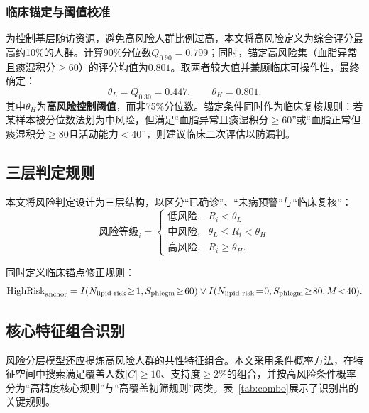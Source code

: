 \documentclass[a4paper,12pt]{ctexart}
\begin{document}
\subsubsection{临床锚定与阈值校准}
为控制基层随访资源，避免高风险人群比例过高，本文将高风险定义为综合评分最高约10\%的人群。计算90\%分位数$Q_{0.90}=0.799$；同时，锚定高风险集（血脂异常且痰湿积分$\geq60$）的评分均值为$0.801$。取两者较大值并兼顾临床可操作性，最终确定：
\begin{equation}
\theta_L=Q_{0.30}=0.447, \qquad \theta_H=0.801.
\end{equation}
其中$\theta_H$为\textbf{高风险控制阈值}，而非75\%分位数。锚定条件同时作为临床复核规则：若某样本被分位数法划为中风险，但满足``血脂异常且痰湿积分$\geq60$''或``血脂正常但痰湿积分$\geq80$且活动能力$<40$''，则建议临床二次评估以防漏判。

\subsection{三层判定规则}

本文将风险判定设计为三层结构，以区分``已确诊''、``未病预警''与``临床复核''：
\begin{equation}
\text{风险等级}_i =
\begin{cases}
\text{低风险}, & R_i < \theta_L \\
\text{中风险}, & \theta_L \leq R_i < \theta_H \\
\text{高风险}, & R_i \geq \theta_H.
\end{cases}
\end{equation}

同时定义临床锚点修正规则：
\begin{equation}
\text{HighRisk}_{\text{anchor}} = I(N_{\text{lipid\text{-}risk}}\!\geq\!1, S_{\text{phlegm}}\!\geq\!60) \lor I(N_{\text{lipid\text{-}risk}}\!=\!0, S_{\text{phlegm}}\!\geq\!80, M\!<\!40).
\end{equation}

\subsection{核心特征组合识别}

风险分层模型还应提炼高风险人群的共性特征组合。本文采用条件概率方法，在特征空间中搜索满足覆盖人数$|C|\geq10$、支持度$\geq2\%$的组合，并按高风险条件概率分为``高精度核心规则''与``高覆盖初筛规则''两类。表~\ref{tab:combo}展示了识别出的关键规则。
\end{document}
